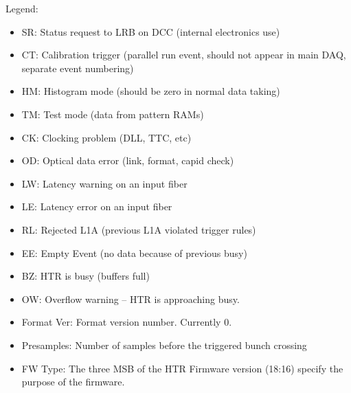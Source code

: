 Legend: 
\begin{itemize}
\item SR: Status request to LRB on DCC (internal electronics use) 
\item CT: Calibration trigger (parallel run event, should not appear in main DAQ, separate event numbering)
\item HM: Histogram mode (should be zero in normal data taking)
\item TM: Test mode (data from pattern RAMs)
\item CK: Clocking problem (DLL, TTC, etc)
\item OD: Optical data error (link, format, capid check)
\item LW: Latency warning on an input fiber
\item LE: Latency error on an input fiber
\item RL: Rejected L1A (previous L1A violated trigger rules)
\item EE: Empty Event (no data because of previous busy)
\item BZ: HTR is busy (buffers full)
\item OW: Overflow warning -- HTR is approaching busy.
\item Format Ver: Format version number.  Currently 0.
\item Presamples: Number of samples before the triggered bunch crossing
\item FW Type: The three MSB of the HTR Firmware version (18:16) specify the purpose of the firmware. 
\end{itemize}


